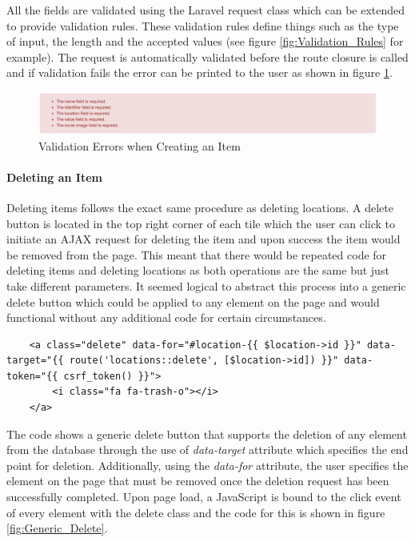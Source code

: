 All the fields are validated using the Laravel request class which can be extended to provide validation rules. These validation rules define things such as the type of input, the length and the accepted values (see figure \ref{fig:Validation_Rules} for example). The request is automatically validated before the route closure is called and if validation fails the error can be printed to the user as shown in figure \ref{fig:Item_Errors}.

\begin{figure}[H]
	\centering
	\includegraphics[width=1.0\textwidth]{images/Frisk/Item_Errors}
	\caption{Validation Errors when Creating an Item} \label{fig:Item_Errors}
\end{figure}

\paragraph{Deleting an Item}
Deleting items follows the exact same procedure as deleting locations. A delete button is located in the top right corner of each tile which the user can click to initiate an AJAX request for deleting the item and upon success the item would be removed from the page. This meant that there would be repeated code for deleting items and deleting locations as both operations are the same but just take different parameters. It seemed logical to abstract this process into a generic delete button which could be applied to any element on the page and would functional without any additional code for certain circumstances.

\begin{lstlisting}
	<a class="delete" data-for="#location-{{ $location->id }}" data-target="{{ route('locations::delete', [$location->id]) }}" data-token="{{ csrf_token() }}">
		<i class="fa fa-trash-o"></i>
	</a>
\end{lstlisting}

The code shows a generic delete button that supports the deletion of any element from the database through the use of \emph{data-target} attribute which specifies the end point for deletion. Additionally, using the \emph{data-for} attribute, the user specifies the element on the page that must be removed once the deletion request has been successfully completed. Upon page load, a JavaScript is bound to the click event of every element with the delete class and the code for this is shown in figure \ref{fig:Generic_Delete}.

